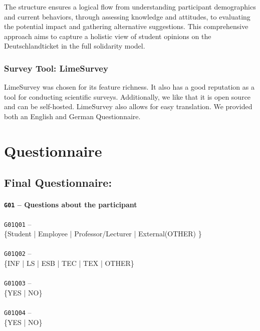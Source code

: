 The structure ensures a logical flow from understanding participant demographics and current behaviors, through assessing knowledge and attitudes, to evaluating the potential impact and gathering alternative suggestions. This comprehensive approach aims to capture a holistic view of student opinions on the Deutschlandticket in the full solidarity model.
\subsection{Survey Tool: LimeSurvey}
LimeSurvey was chosen for its feature richness. It also has a good reputation as a tool for conducting scientific surveys. Additionally, we like that it is open source and can be self-hosted. LimeSurvey also allows for easy translation. We provided both an English and German Questionnaire.
\pagebreak
\chapter{Questionnaire}

\section{Final Questionnaire:}

\subsubsection{\texttt{G01} -- Questions about the participant}
\begin{displayquote}
    \texttt{G01Q01} -- \\
    \{Student | Employee | Professor/Lecturer | External(OTHER) \}\\\\
    \texttt{G01Q02} -- \\
    \{INF | LS | ESB | TEC | TEX | OTHER\}\\\\
    \texttt{G01Q03} -- \\
    \{YES | NO\}\\\\
    \texttt{G01Q04} -- \\
    \{YES | NO\}\\\\
\end{displayquote}


